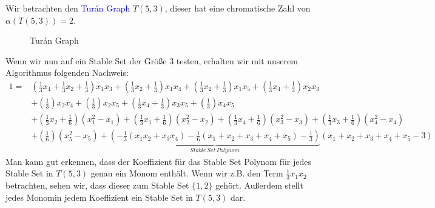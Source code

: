 \begin{example}
Wir betrachten den \textcolor{blue}{Turán Graph} $T(5,3)$, dieser hat eine chromatische Zahl von $\alpha(T(5,3))=2$.

	\begin{figure}[htp]
\begin{center}
\caption[Turán Graph]{Turán Graph}
  \label{Turán Graph}
\end{center}
\end{figure}
\noindent Wenn wir nun auf ein Stable Set der Größe 3 testen, erhalten wir mit unserem Algorithmus folgenden Nachweis:
\begin{align*}
1 = &\left(\frac{1}{3}x_4+\frac{1}{3}x_2+\frac{1}{3}\right)x_1x_3 + \left(\frac{1}{3}x_2+\frac{1}{3}\right)x_1x_4 + \left(\frac{1}{3}x_2+\frac{1}{3}\right)x_1x_5 + \left(\frac{1}{3}x_4+\frac{1}{3}\right)x_2x_3\\ &+ \left(\frac{1}{3}\right)x_2x_4 + \left(\frac{1}{3}\right)x_2x_5 + \left(\frac{1}{3}x_4 +\frac{1}{3}\right)x_3x_5 + \left(\frac{1}{3}\right)x_4x_5 \\ &+ \left(\frac{1}{3}x_2+\frac{1}{6}\right)(x_1^2-x_1) + \left(\frac{1}{3}x_1+\frac{1}{6}\right)(x_2^2-x_2) + \left(\frac{1}{3}x_4+\frac{1}{6}\right)(x_3^2-x_3) + \left(\frac{1}{3}x_3+\frac{1}{6}\right)(x_4^2-x_4) \\ &+ \left(\frac{1}{6}\right)(x_5^2-x_5) + \underbrace{\left(-\frac{1}{3}(x_1x_2 + x_3x_4)-\frac{1}{6}(x_1+x_2+x_3+x_4+x_5)-\frac{1}{3}\right)}_{Stable \, Set \, Polynom} (x_1+x_2+x_3+x_4+x_5-3)
\end{align*}
Man kann gut erkennen, dass der Koeffizient für das Stable Set Polynom für jedes Stable Set in $T(5,3)$ genau ein Monom enthält. Wenn wir z.B. den Term $\frac{1}{3}x_1x_2$ betrachten, sehen wir, dass dieser zum Stable Set $\{1,2\}$ gehört. Außerdem stellt jedes Monomin jedem Koeffizient ein Stable Set in $T(5,3)$ dar.
\end{example}


